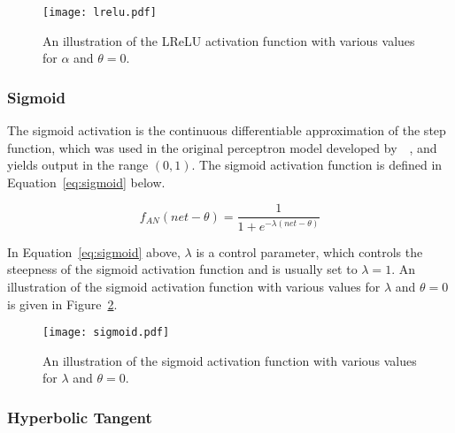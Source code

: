 \begin{figure}[htpb]
      \centering
      \texttt{[image: lrelu.pdf]}
      \caption[The \acs{LReLU} activation function]{An illustration of the \acs{LReLU} activation function with various values for $\alpha$ and $\theta = 0$.}
      \label{fig:anns:activation_functions:leaky_relu}
\end{figure}

\subsubsection{Sigmoid}\label{sec:anns:an:act_functions:sigmoid}

The sigmoid activation is the continuous differentiable approximation of the step function, which was used in the original perceptron model developed by~\citeauthor{ref:rosenblatt:1957}~\cite{ref:rosenblatt:1957}, and yields output in the range $(0, 1)$. The sigmoid activation function is defined in Equation~\eqref{eq:sigmoid} below.

\begin{equation}
      f_{AN}(net - \theta) = \frac{1}{1+e^{-\lambda(net - \theta)}}
      \label{eq:sigmoid}
\end{equation}

\noindent
In Equation~\eqref{eq:sigmoid} above, $\lambda$ is a control parameter, which controls the steepness of the sigmoid activation function and is usually set to $\lambda = 1$. An illustration of the sigmoid activation function with various values for $\lambda$ and $\theta = 0$ is given in Figure~\ref{fig:anns:activation_functions:sigmoid}.

\begin{figure}[htpb]
      \centering
      \texttt{[image: sigmoid.pdf]}
      \caption[The sigmoid activation function]{An illustration of the sigmoid activation function with various values for $\lambda$ and $\theta = 0$.}
      \label{fig:anns:activation_functions:sigmoid}
\end{figure}

\subsubsection{Hyperbolic Tangent}\label{sec:anns:an:act_functions:tanh}

